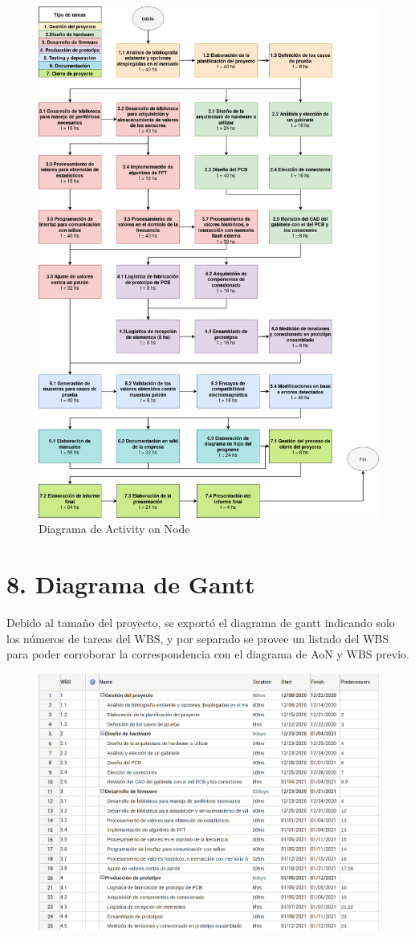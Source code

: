 \documentclass[11pt]{charter}
\begin{document}
\begin{figure}[htpb]
\centering 
\includegraphics[width=.8\textwidth]{./Figuras/ActivityOnNode.png}
\caption{Diagrama de Activity on Node}
\label{fig:AoN}
\end{figure}


\section{8. Diagrama de Gantt}
\label{sec:gantt}

Debido al tamaño del proyecto, se exportó el diagrama de gantt indicando solo los números de tareas del WBS, y por separado se provee un listado del WBS para poder corroborar la correspondencia con el diagrama de AoN y WBS previo.

\begin{figure}[htpb]
\centering 
\includegraphics[width=.8\textwidth]{./Figuras/wbs1.png}
\label{fig:wbs1}
\end{figure}
\end{document}
